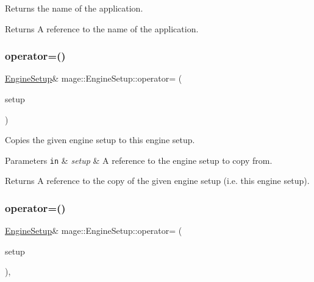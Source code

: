 Returns the name of the application.

\begin{DoxyReturn}{Returns}
A reference to the name of the application. 
\end{DoxyReturn}
\mbox{\label{classmage_1_1_engine_setup_a4234ca6df84db6a2005b994ed42da11f}} 
\subsubsection{\texorpdfstring{operator=()}{operator=()}\hspace{0.1cm}{\footnotesize\ttfamily [1/2]}}
{\footnotesize\ttfamily \mbox{\hyperlink{classmage_1_1_engine_setup}{Engine\+Setup}}\& mage\+::\+Engine\+Setup\+::operator= (\begin{DoxyParamCaption}\item[{const \mbox{\hyperlink{classmage_1_1_engine_setup}{Engine\+Setup}} \&}]{setup }\end{DoxyParamCaption})\hspace{0.3cm}{\ttfamily [default]}}

Copies the given engine setup to this engine setup.


\begin{DoxyParams}[1]{Parameters}
\mbox{\tt in}  & {\em setup} & A reference to the engine setup to copy from. \\
\hline
\end{DoxyParams}
\begin{DoxyReturn}{Returns}
A reference to the copy of the given engine setup (i.\+e. this engine setup). 
\end{DoxyReturn}
\mbox{\label{classmage_1_1_engine_setup_a4c2e71f96f138b28fd6ff1c088d05a53}} 
\subsubsection{\texorpdfstring{operator=()}{operator=()}\hspace{0.1cm}{\footnotesize\ttfamily [2/2]}}
{\footnotesize\ttfamily \mbox{\hyperlink{classmage_1_1_engine_setup}{Engine\+Setup}}\& mage\+::\+Engine\+Setup\+::operator= (\begin{DoxyParamCaption}\item[{\mbox{\hyperlink{classmage_1_1_engine_setup}{Engine\+Setup}} \&\&}]{setup }\end{DoxyParamCaption})\hspace{0.3cm}{\ttfamily [default]}, {\ttfamily [noexcept]}}

